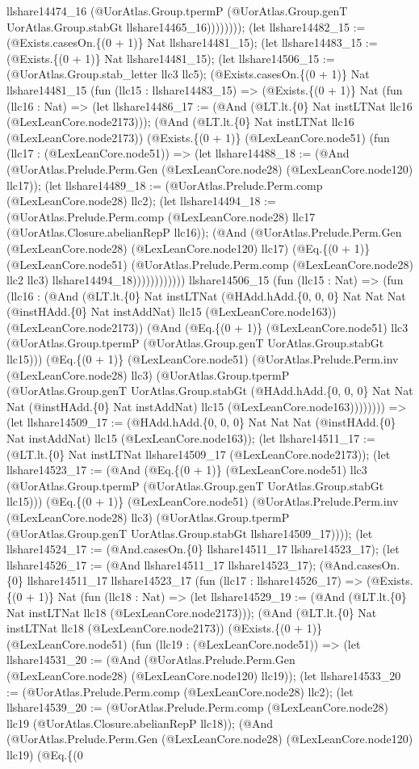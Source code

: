 \documentclass[11pt]{article}
\begin{document}
llshare14474\_16 (@UorAtlas.Group.tpermP (@UorAtlas.Group.genT UorAtlas.Group.stabGt llshare14465\_16)))))))); (let llshare14482\_15 := (@Exists.casesOn.\{(0 + 1)\} Nat llshare14481\_15); (let llshare14483\_15 := (@Exists.\{(0 + 1)\} Nat llshare14481\_15); (let llshare14506\_15 := (@UorAtlas.Group.stab\_letter llc3 llc5); (@Exists.casesOn.\{(0 + 1)\} Nat llshare14481\_15 (fun (llc15 : llshare14483\_15) => (@Exists.\{(0 + 1)\} Nat (fun (llc16 : Nat) => (let llshare14486\_17 := (@And (@LT.lt.\{0\} Nat instLTNat llc16 (@LexLeanCore.node2173))); (@And (@LT.lt.\{0\} Nat instLTNat llc16 (@LexLeanCore.node2173)) (@Exists.\{(0 + 1)\} (@LexLeanCore.node51) (fun (llc17 : (@LexLeanCore.node51)) => (let llshare14488\_18 := (@And (@UorAtlas.Prelude.Perm.Gen (@LexLeanCore.node28) (@LexLeanCore.node120) llc17)); (let llshare14489\_18 := (@UorAtlas.Prelude.Perm.comp (@LexLeanCore.node28) llc2); (let llshare14494\_18 := (@UorAtlas.Prelude.Perm.comp (@LexLeanCore.node28) llc17 (@UorAtlas.Closure.abelianRepP llc16)); (@And (@UorAtlas.Prelude.Perm.Gen (@LexLeanCore.node28) (@LexLeanCore.node120) llc17) (@Eq.\{(0 + 1)\} (@LexLeanCore.node51) (@UorAtlas.Prelude.Perm.comp (@LexLeanCore.node28) llc2 llc3) llshare14494\_18)))))))))))) llshare14506\_15 (fun (llc15 : Nat) => (fun (llc16 : (@And (@LT.lt.\{0\} Nat instLTNat (@HAdd.hAdd.\{0, 0, 0\} Nat Nat Nat (@instHAdd.\{0\} Nat instAddNat) llc15 (@LexLeanCore.node163)) (@LexLeanCore.node2173)) (@And (@Eq.\{(0 + 1)\} (@LexLeanCore.node51) llc3 (@UorAtlas.Group.tpermP (@UorAtlas.Group.genT UorAtlas.Group.stabGt llc15))) (@Eq.\{(0 + 1)\} (@LexLeanCore.node51) (@UorAtlas.Prelude.Perm.inv (@LexLeanCore.node28) llc3) (@UorAtlas.Group.tpermP (@UorAtlas.Group.genT UorAtlas.Group.stabGt (@HAdd.hAdd.\{0, 0, 0\} Nat Nat Nat (@instHAdd.\{0\} Nat instAddNat) llc15 (@LexLeanCore.node163)))))))) => (let llshare14509\_17 := (@HAdd.hAdd.\{0, 0, 0\} Nat Nat Nat (@instHAdd.\{0\} Nat instAddNat) llc15 (@LexLeanCore.node163)); (let llshare14511\_17 := (@LT.lt.\{0\} Nat instLTNat llshare14509\_17 (@LexLeanCore.node2173)); (let llshare14523\_17 := (@And (@Eq.\{(0 + 1)\} (@LexLeanCore.node51) llc3 (@UorAtlas.Group.tpermP (@UorAtlas.Group.genT UorAtlas.Group.stabGt llc15))) (@Eq.\{(0 + 1)\} (@LexLeanCore.node51) (@UorAtlas.Prelude.Perm.inv (@LexLeanCore.node28) llc3) (@UorAtlas.Group.tpermP (@UorAtlas.Group.genT UorAtlas.Group.stabGt llshare14509\_17)))); (let llshare14524\_17 := (@And.casesOn.\{0\} llshare14511\_17 llshare14523\_17); (let llshare14526\_17 := (@And llshare14511\_17 llshare14523\_17); (@And.casesOn.\{0\} llshare14511\_17 llshare14523\_17 (fun (llc17 : llshare14526\_17) => (@Exists.\{(0 + 1)\} Nat (fun (llc18 : Nat) => (let llshare14529\_19 := (@And (@LT.lt.\{0\} Nat instLTNat llc18 (@LexLeanCore.node2173))); (@And (@LT.lt.\{0\} Nat instLTNat llc18 (@LexLeanCore.node2173)) (@Exists.\{(0 + 1)\} (@LexLeanCore.node51) (fun (llc19 : (@LexLeanCore.node51)) => (let llshare14531\_20 := (@And (@UorAtlas.Prelude.Perm.Gen (@LexLeanCore.node28) (@LexLeanCore.node120) llc19)); (let llshare14533\_20 := (@UorAtlas.Prelude.Perm.comp (@LexLeanCore.node28) llc2); (let llshare14539\_20 := (@UorAtlas.Prelude.Perm.comp (@LexLeanCore.node28) llc19 (@UorAtlas.Closure.abelianRepP llc18)); (@And (@UorAtlas.Prelude.Perm.Gen (@LexLeanCore.node28) (@LexLeanCore.node120) llc19) (@Eq.\{(0 
\end{document}
